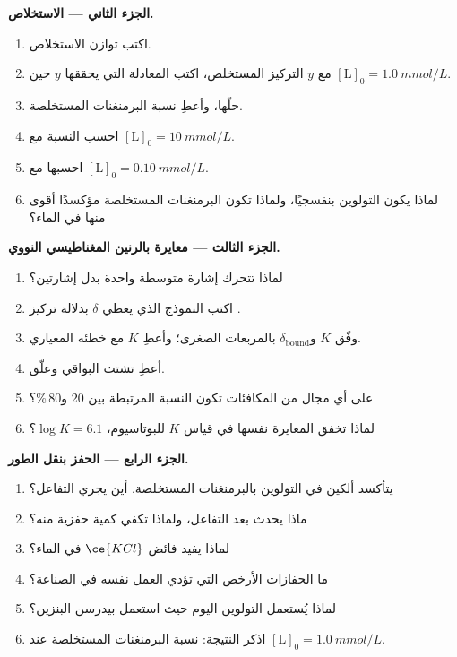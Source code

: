 \begin{problem}
\medskip\noindent\textbf{الجزء الثاني --- الاستخلاص.}
\begin{enumerate}[resume]
  \item اكتب توازن الاستخلاص.
  \item مع $y$ التركيز المستخلص، اكتب المعادلة التي يحققها $y$ حين
        $[\mathrm L]_0 = \qty{1.0}{mmol/L}$.
  \item حلّها، وأعطِ نسبة البرمنغنات المستخلصة.
  \item احسب النسبة مع $[\mathrm L]_0 = \qty{10}{mmol/L}$.
  \item احسبها مع $[\mathrm L]_0 = \qty{0.10}{mmol/L}$.
  \item لماذا يكون التولوين بنفسجيًا، ولماذا تكون البرمنغنات المستخلصة مؤكسدًا أقوى
        منها في الماء؟
\end{enumerate}

\medskip\noindent\textbf{الجزء الثالث --- معايرة بالرنين المغناطيسي النووي.}
\begin{enumerate}[resume]
  \item لماذا تتحرك إشارة متوسطة واحدة بدل إشارتين؟
  \item اكتب النموذج الذي يعطي $\delta$ بدلالة تركيز .
  \item وفّق $K$ و$\delta_{\mathrm{bound}}$ بالمربعات الصغرى؛ وأعطِ $K$ مع خطئه المعياري.
  \item أعطِ تشتت البواقي وعلّق.
  \item على أي مجال من المكافئات تكون النسبة المرتبطة بين 20 و80\,\%؟
  \item لماذا تخفق المعايرة نفسها في قياس $K$ للبوتاسيوم، $\log K = 6.1$؟
\end{enumerate}

\medskip\noindent\textbf{الجزء الرابع --- الحفز بنقل الطور.}
\begin{enumerate}[resume]
  \item يتأكسد ألكين في التولوين بالبرمنغنات المستخلصة. أين يجري
        التفاعل؟
  \item ماذا يحدث  بعد التفاعل، ولماذا تكفي كمية
        حفزية منه؟
  \item لماذا يفيد فائض $\ce{KCl}$ في الماء؟
  \item ما الحفازات الأرخص التي تؤدي العمل نفسه في الصناعة؟
  \item لماذا يُستعمل التولوين اليوم حيث استعمل بيدرسن البنزين؟
  \item اذكر النتيجة: نسبة البرمنغنات المستخلصة عند
        $[\mathrm L]_0 = \qty{1.0}{mmol/L}$.
\end{enumerate}
\end{problem}
